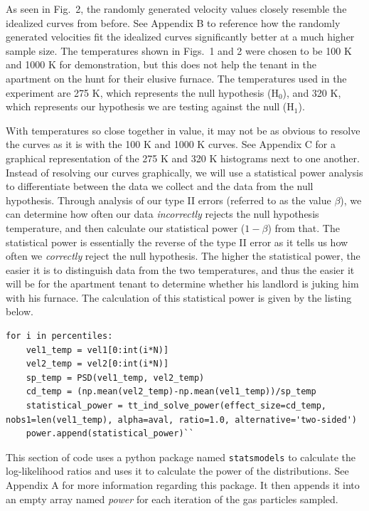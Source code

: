 \documentclass[%
 reprint,
 amsmath,amssymb,
 aps,
]{revtex4-2}
\begin{document}
As seen in Fig.\ 2, the randomly generated velocity values closely resemble the idealized curves from before. See Appendix B to reference how the randomly generated velocities fit the idealized curves significantly better at a much higher sample size. The temperatures shown in Figs.\ 1 and 2 were chosen to be 100 K and 1000 K for demonstration, but this does not help the tenant in the apartment on the hunt for their elusive furnace. The temperatures used in the experiment are 275 K, which represents the null hypothesis (H$_0$), and 320 K, which represents our hypothesis we are testing against the null (H$_1$).

With temperatures so close together in value, it may not be as obvious to resolve the curves as it is with the 100 K and 1000 K curves. See Appendix C for a graphical representation of the 275 K and 320 K histograms next to one another. Instead of resolving our curves graphically, we will use a statistical power analysis to differentiate between the data we collect and the data from the null hypothesis. Through analysis of our type II errors (referred to as the value $\beta$), we can determine how often our data \textit{incorrectly} rejects the null hypothesis temperature, and then calculate our statistical power ($1-\beta$) from that. The statistical power is essentially the reverse of the type II error as it tells us how often we \textit{correctly} reject the null hypothesis. The higher the statistical power, the easier it is to distinguish data from the two temperatures, and thus the easier it will be for the apartment tenant to determine whether his landlord is juking him with his furnace. The calculation of this statistical power is given by the listing below.

\begin{lstlisting}
for i in percentiles:
	vel1_temp = vel1[0:int(i*N)]
	vel2_temp = vel2[0:int(i*N)]
	sp_temp = PSD(vel1_temp, vel2_temp)
	cd_temp = (np.mean(vel2_temp)-np.mean(vel1_temp))/sp_temp
	statistical_power = tt_ind_solve_power(effect_size=cd_temp, nobs1=len(vel1_temp), alpha=aval, ratio=1.0, alternative='two-sided')
	power.append(statistical_power)``
\end{lstlisting}
This section of code uses a python package named \lstinline{statsmodels} to calculate the log-likelihood ratios and uses it to calculate the power of the distributions. See Appendix A for more information regarding this package. It then appends it into an empty array named \textit{power} for each iteration of the gas particles sampled.
\end{document}
